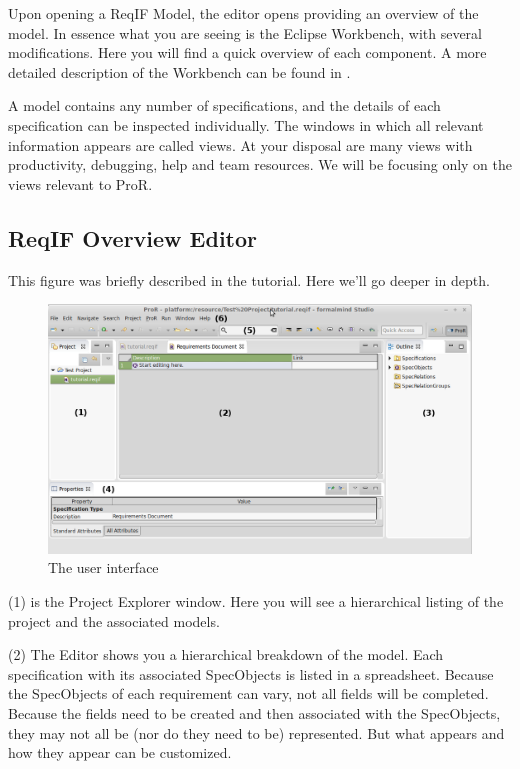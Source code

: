 Upon opening a ReqIF Model, the editor opens providing an overview of the model.  In essence what you are seeing is the Eclipse Workbench, with several modifications.  Here you will find a quick overview of each component.  A more detailed description of the Workbench can be found in 
.

A model contains any number of specifications, and the details of each specification can be inspected individually.  The windows in which all relevant information appears are called views.  At your disposal are many views with productivity, debugging, help and team resources.  We will be focusing only on the views relevant to ProR.

\subsection{ReqIF Overview Editor}

This figure was briefly described in the tutorial.  Here we'll go deeper in depth.

\begin{figure}[H]
  \centering
  \includegraphics[width=\linewidth]{../rmf-images/Screenshot_intro.png}
  \caption{The \pror{} user interface}
  \label{fig:user_interface_overview}
\end{figure}

(1) is the Project Explorer window.  Here you will see a hierarchical listing of the project and the associated models.

(2) The Editor shows you a hierarchical breakdown of the model.  Each specification with its associated SpecObjects is listed in a spreadsheet.  Because the SpecObjects of each requirement can vary, not all fields will be completed.  Because the fields need to be created and then associated with the SpecObjects, they may not all be (nor do they need to be) represented.  But what appears and how they appear can be customized.

